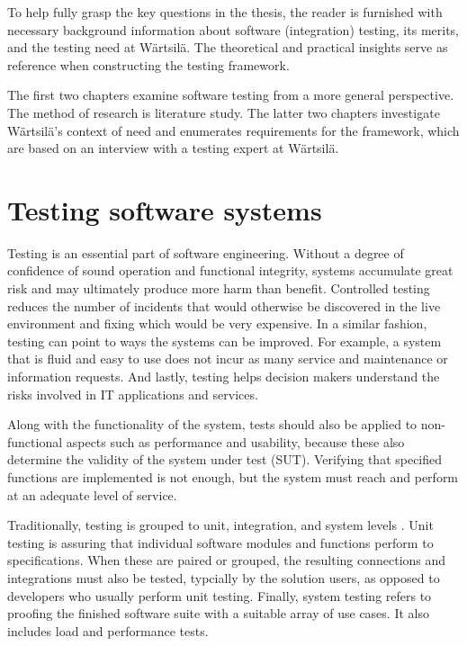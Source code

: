 \documentclass[12pt,a4paper,oneside,pdftex]{report}
\begin{document}

To help fully grasp the key questions in the thesis, the reader is furnished with necessary background information about software (integration) testing, its merits, and the testing need at Wärtsilä. The theoretical and practical insights serve as reference when constructing the testing framework. 

The first two chapters examine software testing from a more general perspective. The method of research is literature study. The latter two chapters investigate Wärtsilä's context of need and enumerates requirements for the framework, which are based on an interview with a testing expert at Wärtsilä.

\section{Testing software systems}

Testing is an essential part of software engineering. Without a degree of confidence of sound operation and functional integrity, systems accumulate great risk and may ultimately produce more harm than benefit. Controlled testing reduces the number of incidents that would otherwise be discovered in the live environment and fixing which would be very expensive. \citep{jenkins2008software, liu2009unified} In a similar fashion, testing can point to ways the systems can be improved. For example, a system that is fluid and easy to use does not incur as many service and maintenance or information requests. And lastly, testing helps decision makers understand the risks involved in IT applications and services.

Along with the functionality of the system, tests should also be applied to non-functional aspects such as performance and usability, because these also determine the validity of the system under test (SUT). Verifying that specified functions are implemented is not enough, but the system must reach and perform at an adequate level of service. 

Traditionally, testing is grouped to unit, integration, and system levels \citep{jenkins2008software, burnstein2003practical}. Unit testing is assuring that individual software modules and functions perform to specifications. When these are paired or grouped, the resulting connections and integrations must also be tested, typcially by the solution users, as opposed to developers who usually perform unit testing. Finally, system testing refers to proofing the finished software suite with a suitable array of use cases. It also includes load and performance tests. \citep{rehmman2007testing}
\end{document}
